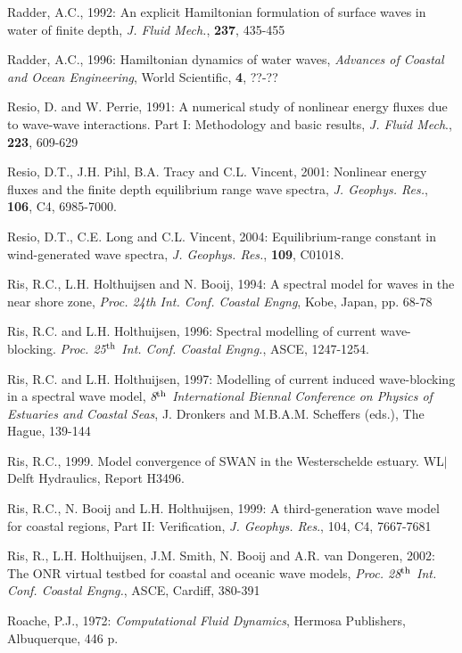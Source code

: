 \documentclass[12pt]{book}
\begin{document}
\begin{thebibliography}{10}
Radder, A.C., 1992: An explicit Hamiltonian formulation of surface waves in water of finite depth, {\it J. Fluid
Mech.}, {\bf 237}, 435-455

Radder, A.C., 1996: Hamiltonian dynamics of water waves, {\it Advances of Coastal and Ocean Engineering},
World Scientific, {\bf 4}, ??-??

Resio, D. and W. Perrie, 1991: A numerical study of nonlinear energy fluxes due to wave-wave
interactions. Part I: Methodology and basic results, {\it J. Fluid Mech}., {\bf 223}, 609-629

Resio, D.T., J.H. Pihl, B.A. Tracy and C.L. Vincent, 2001: Nonlinear energy fluxes and  the finite depth equilibrium
range wave spectra, {\it J. Geophys. Res.}, {\bf 106}, C4, 6985-7000.

Resio, D.T., C.E. Long and C.L. Vincent, 2004: Equilibrium-range constant in wind-generated wave spectra,
{\it J. Geophys. Res.}, {\bf 109}, C01018.

Ris, R.C., L.H. Holthuijsen and N. Booij, 1994: A spectral model for waves in the near shore zone, {\it Proc.
24th Int. Conf. Coastal Engng}, Kobe, Japan, pp. 68-78

Ris, R.C. and L.H. Holthuijsen, 1996: Spectral modelling of current wave-blocking.
{\it Proc. 25$^{{\rm th}}$ Int. Conf. Coastal Engng.}, ASCE, 1247-1254.

Ris, R.C. and L.H. Holthuijsen, 1997: Modelling of current induced wave-blocking in a spectral wave
model, {\it 8$^{{\rm th}}$ International Biennal Conference on  Physics of Estuaries and Coastal Seas}, J.
Dronkers and M.B.A.M. Scheffers (eds.), The Hague, 139-144

Ris, R.C., 1999. Model convergence of SWAN in the Westerschelde estuary.
WL$\vert$Delft Hydraulics, Report H3496.

Ris, R.C., N. Booij and L.H. Holthuijsen, 1999: A third-generation wave model for coastal regions, Part II:
Verification,  {\it J. Geophys. Res}., 104, C4, 7667-7681

Ris, R., L.H. Holthuijsen, J.M. Smith, N. Booij and A.R. van Dongeren, 2002: The ONR virtual testbed
for coastal and oceanic wave models, {\it Proc. 28$^{{\rm th}}$ Int. Conf. Coastal Engng.}, ASCE, Cardiff, 380-391

Roache, P.J., 1972: {\it Computational Fluid Dynamics}, Hermosa Publishers, Albuquerque, 446 p.


\end{thebibliography}
\end{document}
